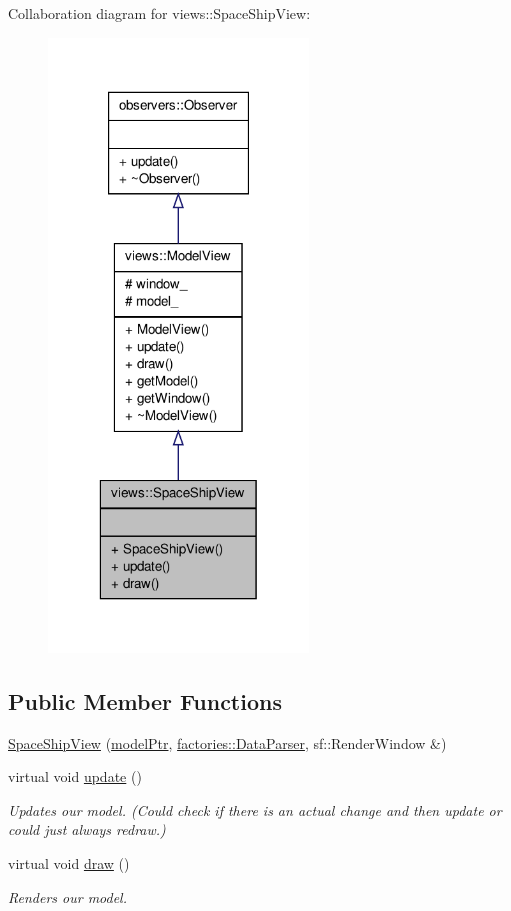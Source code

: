 \-Collaboration diagram for views\-:\-:\-Space\-Ship\-View\-:
\nopagebreak
\begin{figure}[H]
\begin{center}
\leavevmode
\includegraphics[width=196pt]{d4/da3/classviews_1_1SpaceShipView__coll__graph}
\end{center}
\end{figure}
\subsection*{\-Public \-Member \-Functions}
\begin{DoxyCompactItemize}
\item 
\hyperlink{classviews_1_1SpaceShipView_a80d5148a9b4c304b68978578286352a4}{\-Space\-Ship\-View} (\hyperlink{ModelView_8h_a78966ddb517fca8d2b29a2bc5c31e74e}{model\-Ptr}, \hyperlink{classfactories_1_1DataParser}{factories\-::\-Data\-Parser}, sf\-::\-Render\-Window \&)
\item 
virtual void \hyperlink{classviews_1_1SpaceShipView_a25d82746241f5e18ad1b8041b30a9a88}{update} ()
\begin{DoxyCompactList}\small\item\em \-Updates our model. (\-Could check if there is an actual change and then update or could just always redraw.) \end{DoxyCompactList}\item 
virtual void \hyperlink{classviews_1_1SpaceShipView_a54809fd6b2877f3ea7d3d57db8155432}{draw} ()
\begin{DoxyCompactList}\small\item\em \-Renders our model. \end{DoxyCompactList}\end{DoxyCompactItemize}


